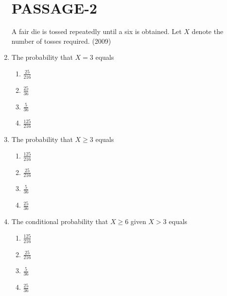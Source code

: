 \documentclass[journal,12pt,onecolumn,article]{IEEEtran}
\theoremstyle{remark}
\begin{document}
\begin{enumerate}
		\section*{PASSAGE-2}
		A fair die is tossed repeatedly until a six is obtained. Let $X$ denote the number of tosses required. \hfill(2009)
         \item The probability that $X=3$ equals
		 \begin{enumerate}
				 \item $\frac{25}{216}$
				 \item $\frac{25}{36}$
				 \item $\frac{5}{36}$
				 \item $\frac{125}{216}$
		 \end{enumerate}
	 \item The probability that $X\ge3$ equals 
		 \begin{enumerate}
				 \item $\frac{125}{216}$
				 \item $\frac{25}{216}$
				 \item $\frac{5}{36}$
				 \item $\frac{25}{36}$
		 \end{enumerate}
	 \item The conditional probability that $X\ge6$ given $X>3$ equals
		 \begin{enumerate}
				 \item $\frac{125}{216}$
				 \item $\frac{25}{216}$
				 \item $\frac{5}{36}$
				 \item $\frac{25}{36}$
		 \end{enumerate}

\end{enumerate}
\end{document}
